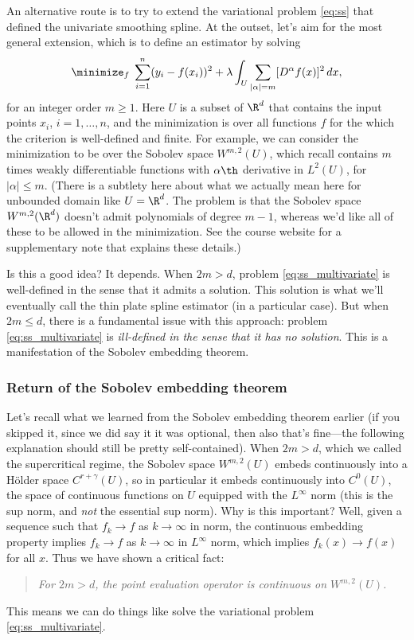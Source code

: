\documentclass{article}
\begin{document}
An alternative route is to try to extend the variational problem \eqref{eq:ss}
that defined the univariate smoothing spline. At the outset, let's aim for the
most general extension, which is to define an estimator by solving
\begin{equation}
\label{eq:ss_multivariate}
\minimize_f \; \sum_{i=1}^n (y_i - f(x_i))^2 + \lambda \int_U \sum_{|\alpha| =
  m} [D^\alpha f(x)]^2 \, dx,   
\end{equation}
for an integer order $m \geq 1$. Here $U$ is a subset of $\R^d$ that contains
the input points $x_i$, $i=1,\dots,n$, and the minimization is over all
functions $f$ for the which the criterion is well-defined and finite. For
example, we can consider the minimization to be over the Sobolev space
$W^{m,2}(U)$, which recall contains $m$ times weakly differentiable functions
with $\alpha\th$ derivative in $L^2(U)$, for $|\alpha| \leq m$. (There is a
subtlety here about what we actually mean here for unbounded domain like $U =
\R^d$. The problem is that the Sobolev space  $W^{m,2}(\R^d)$ doesn't admit
polynomials of degree $m-1$, whereas we'd like all of these to be allowed in the
minimization. See the course website for a supplementary note that explains
these details.) 

Is this a good idea? It depends. When $2m > d$, problem
\eqref{eq:ss_multivariate} is well-defined in the sense that it admits a
solution. This solution is what we'll eventually call the thin plate spline
estimator (in a particular case). But when $2m \leq d$, there is a fundamental
issue with this approach: problem \eqref{eq:ss_multivariate} is
\emph{ill-defined in the sense that it has no solution}. This is a manifestation
of the Sobolev embedding theorem.

\subsubsection{Return of the Sobolev embedding theorem}

Let's recall what we learned from the Sobolev embedding theorem earlier (if you
skipped it, since we did say it it was optional, then also that's fine---the
following explanation should still be pretty self-contained). When $2m > d$,
which we called the supercritical regime, the Sobolev space $W^{m,2}(U)$ embeds
continuously into a H{\"o}lder space $C^{r+\gamma}(U)$, so in particular it
embeds continuously into $C^0(U)$, the space of continuous functions on $U$
equipped with the $L^\infty$ norm (this is the sup norm, and \emph{not} the
essential sup norm). Why is this important? Well, given a sequence such that
$f_k \to f$ as $k \to \infty$ in  norm, the
continuous embedding property implies $f_k \to f$ as $k \to \infty$ in
$L^\infty$ norm, which implies $f_k(x) \to f(x)$ for all $x$. Thus we have shown
a critical fact: 
\begin{quote}
\centering\it
For $2m > d$, the point evaluation operator is continuous on $W^{m,2}(U)$.   
\end{quote}
This means we can do things like solve the variational problem
\eqref{eq:ss_multivariate}. 
\end{document}
